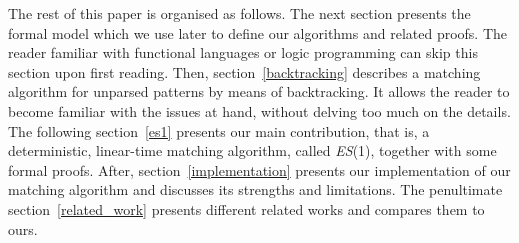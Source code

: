 







The rest of this paper is organised as follows. The next section
presents the formal model which we use later to define our algorithms
and related proofs. The reader familiar with functional languages or
logic programming can skip this section upon first reading.  Then,
section~\ref{backtracking} describes a matching algorithm for unparsed
patterns by means of backtracking. It allows the reader to become
familiar with the issues at hand, without delving too much on the
details. The following section~\ref{es1} presents our main
contribution, that is, a deterministic, linear\hyp{}time matching
algorithm, called \textit{ES}(1), together with some formal
proofs. After, section~\ref{implementation} presents our
implementation of our matching algorithm and discusses its strengths
and limitations. The penultimate section~\ref{related_work} presents
different related works and compares them to ours.
